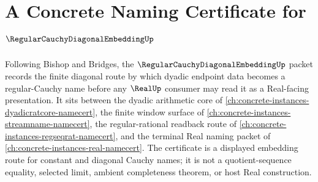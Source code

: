 \chapter{A Concrete Naming Certificate for $\RegularCauchyDiagonalEmbeddingUp$}
\label{ch:concrete-instances-regular-cauchy-diagonal-embedding-namecert}

Following Bishop and Bridges, the $\RegularCauchyDiagonalEmbeddingUp$ packet records the finite diagonal route by which dyadic endpoint data becomes a regular-Cauchy name before any $\RealUp$ consumer may read it as a Real-facing presentation. It sits between the dyadic arithmetic core of \autoref{ch:concrete-instances-dyadicratcore-namecert}, the finite window surface of \autoref{ch:concrete-instances-streamname-namecert}, the regular-rational readback route of \autoref{ch:concrete-instances-regseqrat-namecert}, and the terminal Real naming packet of \autoref{ch:concrete-instances-real-namecert}. The certificate is a displayed embedding route for constant and diagonal Cauchy names; it is not a quotient-sequence equality, selected limit, ambient completeness theorem, or host Real construction.

